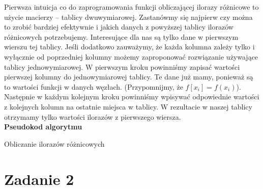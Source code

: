 \documentclass[]{article}
\begin{document}
	\noindent Pierwsza intuicja co do zaprogramowania funkcji obliczającej ilorazy różnicowe to użycie macierzy -- tablicy dwuwymiarowej. Zastanówmy się najpierw czy można to zrobić bardziej efektywnie i jakich danych z powyższej tablicy ilorazów różnicowych potrzebujemy. Interesujące dla nas są tylko dane w pierwszym wierszu tej tablicy. Jeśli dodatkowo zauważymy, że każda kolumna zależy tylko i wyłącznie od poprzedniej kolumny możemy zaproponować rozwiązanie używające tablicy jednowymiarowej. W pierwszym kroku powinniśmy zapisać wartości pierwszej kolumny do jednowymiarowej tablicy. Te dane już mamy, ponieważ są to wartości funkcji w danych węzłach. (Przypomnijmy, że $f[x_i] = f(x_i)$). Następnie w każdym kolejnym kroku powinniśmy wpisywać odpowiednie
	wartości z kolejnych kolumn na ostatnie miejsca w tablicy. W rezultacie w naszej tablicy otrzymamy tylko wartości ilorazów z pierwszego wiersza.\\
	\textbf{Pseudokod algorytmu}\\
	\begin{algorithm}[h]
		\DontPrintSemicolon
		
		
		\caption{Obliczanie ilorazów różnicowych}
	\end{algorithm}
	
	\section*{Zadanie 2}
	
\end{document}
